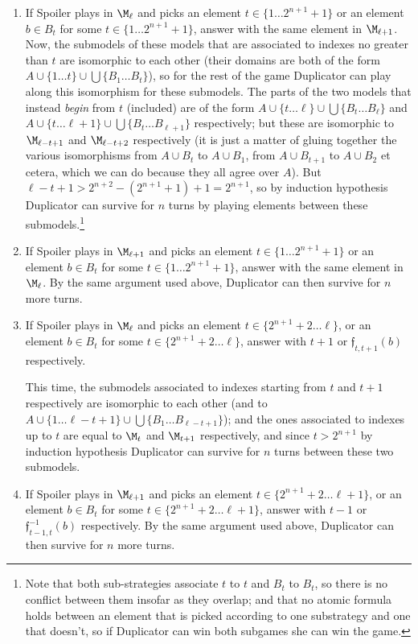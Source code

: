 \begin{enumerate}
\item If Spoiler plays in $\M_\ell$ and picks an element $t \in \{1 \ldots 2^{n+1}+1\}$ or an element $b \in B_t$ for some $t \in \{1 \ldots 2^{n+1}+1\}$, answer with the same element in $\M_{\ell+1}$. Now, the submodels of these models that are associated to indexes no greater than $t$ are isomorphic to each other (their domains are both of the form $A \cup \{1 \ldots t\} \cup \bigcup \{B_1 \ldots B_t\}$), so for the rest of the game Duplicator can play along this isomorphism for these submodels. The parts of the two models that instead \emph{begin} from $t$ (included) are of the form $A \cup \{t \ldots \ell\} \cup \bigcup\{B_{t} \ldots B_{\ell}\}$ and $A \cup \{t \ldots \ell+1\} \cup \bigcup\{B_{t} \ldots B_{\ell+1}\}$ respectively; but these are isomorphic to $\M_{\ell - t+1}$ and $\M_{\ell-t+2}$ respectively (it is just a matter of gluing together the various isomorphisms from $A \cup B_{t}$ to $A \cup B_1$, from $A \cup B_{t+1}$ to $A \cup B_2$ et cetera, which we can do because they all agree over $A$). But $\ell - t + 1> 2^{n+2} - (2^{n+1}+1) +1 = 2^{n+1}$, so by induction hypothesis Duplicator can survive for $n$ turns by playing elements between these submodels.\footnote{Note that both sub-strategies associate $t$ to $t$ and $B_t$ to $B_t$, so there is no conflict between them insofar as they overlap; and that no atomic formula holds between an element that is picked according to one substrategy and one that doesn't, so if Duplicator can win both subgames she can win the game.}
\item If Spoiler plays in $\M_{\ell + 1}$ and picks an element $t \in \{1 \ldots 2^{n+1}+1\}$ or an element $b \in B_t$ for some $t \in \{1 \ldots 2^{n+1}+1\}$, answer with the same element in $\M_{\ell}$. By the same argument used above, Duplicator can then survive for $n$ more turns.
\item If Spoiler plays in $\M_\ell$ and picks an element $t \in \{2^{n+1}+2 \ldots \ell\}$, or an element $b \in B_t$ for some $t \in \{2^{n+1}+2 \ldots \ell\}$, answer with $t+1$ or $\mathfrak f_{t,t+1}(b)$ respectively.

This time, the submodels associated to indexes starting from $t$ and $t+1$ respectively are isomorphic to each other (and to $A \cup \{1 \ldots \ell - t+1\} \cup \bigcup\{B_1 \ldots B_{\ell-t+1}\}$); and the ones associated to indexes up to $t$ are equal to $\M_{t}$ and $\M_{t+1}$ respectively, and since $t > 2^{n+1}$ by induction hypothesis Duplicator can survive for $n$ turns between these two submodels.
\item If Spoiler plays in $\M_{\ell+1}$ and picks an element $t \in \{2^{n+1}+2 \ldots \ell+1\}$, or an element $b \in B_t$ for some $t \in \{2^{n+1}+2 \ldots \ell+1\}$, answer with $t-1$ or $\mathfrak f_{t-1,t}^{-1}(b)$ respectively. By the same argument used above, Duplicator can then survive for $n$ more turns.
\end{enumerate}



